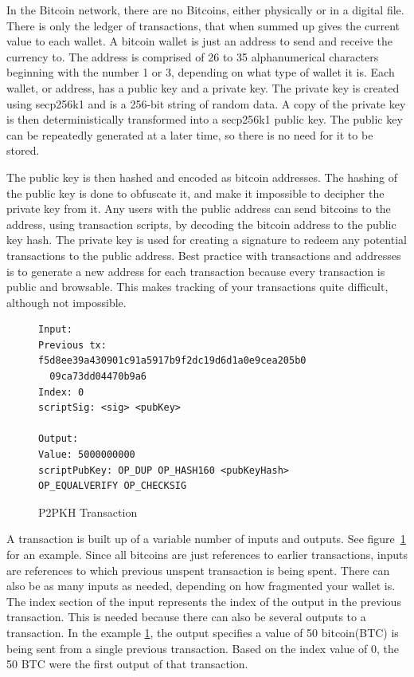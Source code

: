 \documentclass[12pt]{article}
\begin{document}
In the Bitcoin network, there are no Bitcoins, either physically or in a digital file. There is only the ledger of transactions, that when summed up gives the current value to each wallet. A bitcoin wallet is just an address to send and receive the currency to. The address is comprised of 26 to 35 alphanumerical characters beginning with the number 1 or 3, depending on what type of wallet it is. Each wallet, or address, has a public key and a private key. The private key is created using secp256k1\cite{sigalg} and is a 256-bit string of random data. A copy of the private key is then deterministically transformed into a secp256k1 public key. The public key can be repeatedly generated at a later time, so there is no need for it to be stored. 

The public key is then hashed and encoded as bitcoin addresses. The hashing of the public key is done to obfuscate it, and make it impossible to decipher the private key from it. Any users with the public address can send bitcoins to the address, using transaction scripts, by decoding the bitcoin address to the public key hash. The private key is used for creating a signature to redeem any potential transactions to the public address. Best practice with transactions and addresses is to generate a new address for each transaction because every transaction is public and browsable. This makes tracking of your transactions quite difficult, although not impossible\cite{meiklejohn2013fistful}. 

\begin{figure}[h!]
\begin{lstlisting}[numbers=none]
Input:
Previous tx: f5d8ee39a430901c91a5917b9f2dc19d6d1a0e9cea205b0
  09ca73dd04470b9a6
Index: 0
scriptSig: <sig> <pubKey>

Output:
Value: 5000000000
scriptPubKey: OP_DUP OP_HASH160 <pubKeyHash>
OP_EQUALVERIFY OP_CHECKSIG
 \end{lstlisting}
 \caption{P2PKH Transaction}
 \label{fig:transaction}
\end{figure}

A transaction is built up of a variable number of inputs and outputs. See figure~\ref{fig:transaction}  for an example. Since all bitcoins are just references to earlier transactions, inputs are references to which previous unspent transaction is being spent. There can also be as many inputs as needed, depending on how fragmented your wallet is. The index section of the input represents the index of the output in the previous transaction. This is needed because there can also be several outputs to a transaction. In the example \ref{fig:transaction}, the output specifies a value of 50 bitcoin(BTC) is being sent from a single previous transaction. Based on the index value of 0, the 50 BTC were the first output of that transaction. 
\end{document}
